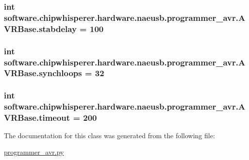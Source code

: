 \subsubsection[{stabdelay}]{\setlength{\rightskip}{0pt plus 5cm}int software.\+chipwhisperer.\+hardware.\+naeusb.\+programmer\+\_\+avr.\+A\+V\+R\+Base.\+stabdelay = 100\hspace{0.3cm}{\ttfamily [static]}}\label{classsoftware_1_1chipwhisperer_1_1hardware_1_1naeusb_1_1programmer__avr_1_1AVRBase_a46d59905ac47fec2693c6a21cfa905d7}
\hypertarget{classsoftware_1_1chipwhisperer_1_1hardware_1_1naeusb_1_1programmer__avr_1_1AVRBase_a4975f3c6629c4fed95aa8102316e61a8}{}
\subsubsection[{synchloops}]{\setlength{\rightskip}{0pt plus 5cm}int software.\+chipwhisperer.\+hardware.\+naeusb.\+programmer\+\_\+avr.\+A\+V\+R\+Base.\+synchloops = 32\hspace{0.3cm}{\ttfamily [static]}}\label{classsoftware_1_1chipwhisperer_1_1hardware_1_1naeusb_1_1programmer__avr_1_1AVRBase_a4975f3c6629c4fed95aa8102316e61a8}
\hypertarget{classsoftware_1_1chipwhisperer_1_1hardware_1_1naeusb_1_1programmer__avr_1_1AVRBase_a9c709727efbca87100cdfa5c95fc6a22}{}
\subsubsection[{timeout}]{\setlength{\rightskip}{0pt plus 5cm}int software.\+chipwhisperer.\+hardware.\+naeusb.\+programmer\+\_\+avr.\+A\+V\+R\+Base.\+timeout = 200\hspace{0.3cm}{\ttfamily [static]}}\label{classsoftware_1_1chipwhisperer_1_1hardware_1_1naeusb_1_1programmer__avr_1_1AVRBase_a9c709727efbca87100cdfa5c95fc6a22}


The documentation for this class was generated from the following file\+:\begin{DoxyCompactItemize}
\item 
\hyperlink{programmer__avr_8py}{programmer\+\_\+avr.\+py}\end{DoxyCompactItemize}

